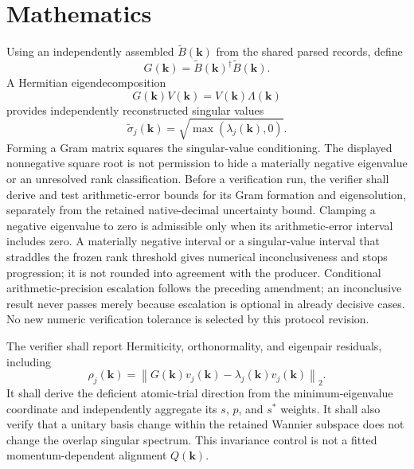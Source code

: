 \documentclass[11pt]{report}
\begin{document}
\section{Mathematics}

Using an independently assembled $\widetilde B(\mathbf{k})$ from the shared parsed
records, define
\begin{equation}
 G(\mathbf{k})=\widetilde B(\mathbf{k})^{\dagger}\widetilde B(\mathbf{k}).
 \label{eq:csd1v-gram}
\end{equation}
A Hermitian eigendecomposition
\begin{equation}
 G(\mathbf{k})V(\mathbf{k})=
 V(\mathbf{k})\Lambda(\mathbf{k})
\end{equation}
provides independently reconstructed singular values
\begin{equation}
 \widetilde\sigma_j(\mathbf{k})=
 \sqrt{\max(\lambda_j(\mathbf{k}),0)}.
\end{equation}
Forming a Gram matrix squares the singular-value conditioning.  The displayed
nonnegative square root is not permission to hide a materially negative eigenvalue or
an unresolved rank classification.  Before a verification run, the verifier shall
derive and test arithmetic-error bounds for its Gram formation and eigensolution,
separately from the retained native-decimal uncertainty bound.  Clamping a negative
eigenvalue to zero is admissible only when its arithmetic-error interval includes
zero.  A materially negative interval or a singular-value interval that straddles the
frozen rank threshold gives numerical inconclusiveness and stops progression; it is
not rounded into agreement with the producer.  Conditional arithmetic-precision
escalation follows the preceding amendment; an inconclusive result never passes merely
because escalation is optional in already decisive cases.  No new numeric verification tolerance
is selected by this protocol revision.

The verifier shall report Hermiticity, orthonormality, and eigenpair residuals, including
\begin{equation}
 \rho_j(\mathbf{k})=
 \left\|G(\mathbf{k})v_j(\mathbf{k})-
 \lambda_j(\mathbf{k})v_j(\mathbf{k})\right\|_2.
\end{equation}
It shall derive the deficient atomic-trial direction from the minimum-eigenvalue
coordinate and independently aggregate its $s$, $p$, and $s^*$ weights.  It shall also
verify that a unitary basis change within the retained Wannier subspace does not change
the overlap singular spectrum.  This invariance control is not a fitted
momentum-dependent alignment $Q(\mathbf{k})$.
\end{document}
